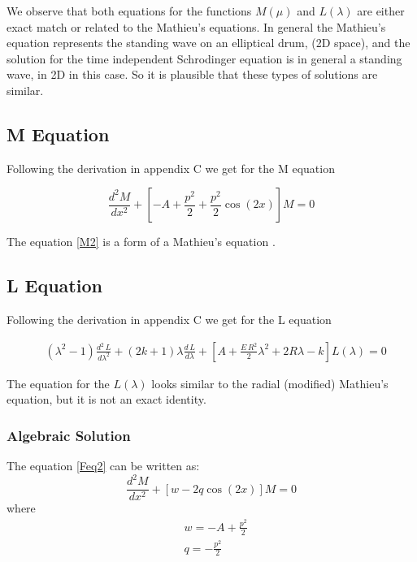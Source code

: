 We observe that both equations for the functions $ M(\mu) $ and $ L(\lambda) $ are either exact match or related to the Mathieu's equations. In general the Mathieu's equation represents the standing wave on an elliptical drum, (2D space), and the solution for the time independent Schrodinger equation is in general a standing wave, in 2D in this case. So it is plausible that these types of solutions are similar.

\subsection{ M Equation }

Following the derivation in appendix C we get for the M equation

\begin{equation}\label{Feq2}
\frac{d^2 M}{d x^2} + \left[-A + \frac{p^2}{2} + \frac{p^2}{2}\cos(2x) \right]M = 0 
\end{equation}

The equation \eqref{M2} is a form of a  Mathieu's equation \cite{Mathieu2}. 

\subsection{ L Equation }

Following the derivation in appendix C we get for the L equation

\begin{equation}\label{L2-2}
\begin{split}
& (\lambda^2-1)\frac{d^2\,L}{d\lambda^2} + (2k+1)\lambda \frac{d\,L}{d\lambda} +  \left[A + \frac{E\,R^2}{2}\lambda^2 + 2R\lambda  -k \right]L(\lambda) = 0
\end{split}
\end{equation}

The equation for the $ L(\lambda) $ looks similar to the radial (modified) Mathieu's equation, but it is not an exact identity. 

\subsubsection{Algebraic Solution}

The equation \eqref{Feq2} can be written as:
\begin{equation}\label{FeqM }
\frac{d^2 M}{d x^2} + \left[w - 2q\cos(2x)\right]M = 0
\end{equation}
where
\begin{equation}
\begin{split}
& w = - A + \frac{p^2}{2} \\[.7em]
& q = - \frac{p^2}{2}
\end{split}
\end{equation}


